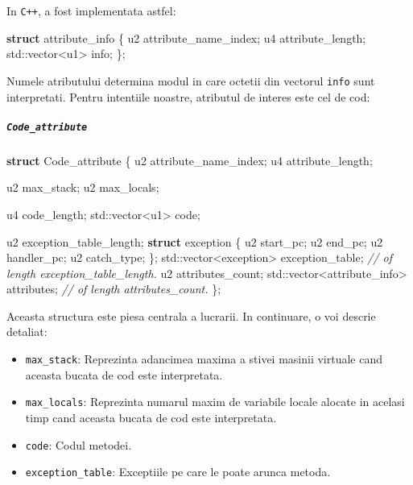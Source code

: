 \documentclass[]{article}
\newenvironment{Shaded}{}{}
\newcommand{\KeywordTok}[1]{\textcolor[rgb]{0.00,0.44,0.13}{\textbf{#1}}}
\newcommand{\DataTypeTok}[1]{\textcolor[rgb]{0.56,0.13,0.00}{#1}}
\newcommand{\CommentTok}[1]{\textcolor[rgb]{0.38,0.63,0.69}{\textit{#1}}}
\newcommand{\BuiltInTok}[1]{#1}
\newcommand{\NormalTok}[1]{#1}
\providecommand{\tightlist}{%
  \setlength{\itemsep}{0pt}\setlength{\parskip}{0pt}}
\let\oldsubparagraph\subparagraph
\renewcommand{\subparagraph}[1]{\oldsubparagraph{#1}\mbox{}}
\begin{document}
In \texttt{C++}, a fost implementata astfel:

\begin{Shaded}
\begin{Highlighting}[]
\KeywordTok{struct}\NormalTok{ attribute_info \{}
\NormalTok{    u2 attribute_name_index;}
\NormalTok{    u4 attribute_length;}
    \BuiltInTok{std::}\NormalTok{vector<u1> info;}
\NormalTok{\};}
\end{Highlighting}
\end{Shaded}

Numele atributului determina modul in care octetii din vectorul
\texttt{info} sunt interpretati. Pentru intentiile noastre, atributul de
interes este cel de cod:

\subparagraph{\texorpdfstring{\texttt{Code\_attribute}}{Code\_attribute}}\label{code_attribute}

\begin{Shaded}
\begin{Highlighting}[]
\KeywordTok{struct}\NormalTok{ Code_attribute \{}
\NormalTok{    u2 attribute_name_index;}
\NormalTok{    u4 attribute_length;}

\NormalTok{    u2 max_stack;}
\NormalTok{    u2 max_locals;}

\NormalTok{    u4 code_length;}
    \BuiltInTok{std::}\NormalTok{vector<u1> code;}

\NormalTok{    u2 exception_table_length;}
    \KeywordTok{struct}\NormalTok{ exception \{}
\NormalTok{        u2 start_pc;}
\NormalTok{        u2 end_pc;}
\NormalTok{        u2 handler_pc;}
\NormalTok{        u2 }\DataTypeTok{catch_type}\NormalTok{;}
\NormalTok{    \};}
    \BuiltInTok{std::}\NormalTok{vector<exception> exception_table; }\CommentTok{// of length exception_table_length.}
\NormalTok{    u2 attributes_count;}
    \BuiltInTok{std::}\NormalTok{vector<attribute_info> attributes; }\CommentTok{// of length attributes_count.}
\NormalTok{\};}
\end{Highlighting}
\end{Shaded}

Aceasta structura este piesa centrala a lucrarii. In continuare, o voi
descrie detaliat:

\begin{itemize}
\tightlist
\item
  \texttt{max\_stack}: Reprezinta adancimea maxima a stivei masinii
  virtuale cand aceasta bucata de cod este interpretata.
\item
  \texttt{max\_locals}: Reprezinta numarul maxim de variabile locale
  alocate in acelasi timp cand aceasta bucata de cod este interpretata.
\item
  \texttt{code}: Codul metodei.
\item
  \texttt{exception\_table}: Exceptiile pe care le poate arunca metoda.
\end{itemize}
\end{document}
